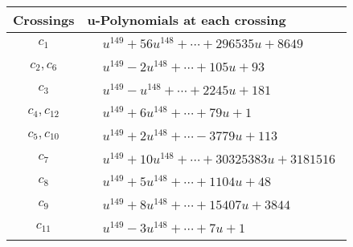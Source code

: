 \documentclass[1p]{elsarticle_modified}
\theoremstyle{definition}
\begin{document}
\begin{tabular}{m{50pt}|m{274pt}}
Crossings & \hspace{64pt}u-Polynomials at each crossing \\
\hline $$\begin{aligned}c_{1}\end{aligned}$$&$\begin{aligned}
&u^{149}+56 u^{148}+\cdots+296535 u+8649
\end{aligned}$\\
\hline $$\begin{aligned}c_{2},c_{6}\end{aligned}$$&$\begin{aligned}
&u^{149}-2 u^{148}+\cdots+105 u+93
\end{aligned}$\\
\hline $$\begin{aligned}c_{3}\end{aligned}$$&$\begin{aligned}
&u^{149}- u^{148}+\cdots+2245 u+181
\end{aligned}$\\
\hline $$\begin{aligned}c_{4},c_{12}\end{aligned}$$&$\begin{aligned}
&u^{149}+6 u^{148}+\cdots+79 u+1
\end{aligned}$\\
\hline $$\begin{aligned}c_{5},c_{10}\end{aligned}$$&$\begin{aligned}
&u^{149}+2 u^{148}+\cdots-3779 u+113
\end{aligned}$\\
\hline $$\begin{aligned}c_{7}\end{aligned}$$&$\begin{aligned}
&u^{149}+10 u^{148}+\cdots+30325383 u+3181516
\end{aligned}$\\
\hline $$\begin{aligned}c_{8}\end{aligned}$$&$\begin{aligned}
&u^{149}+5 u^{148}+\cdots+1104 u+48
\end{aligned}$\\
\hline $$\begin{aligned}c_{9}\end{aligned}$$&$\begin{aligned}
&u^{149}+8 u^{148}+\cdots+15407 u+3844
\end{aligned}$\\
\hline $$\begin{aligned}c_{11}\end{aligned}$$&$\begin{aligned}
&u^{149}-3 u^{148}+\cdots+7 u+1
\end{aligned}$\\
\hline
\end{tabular}\\~\\
\end{document}
